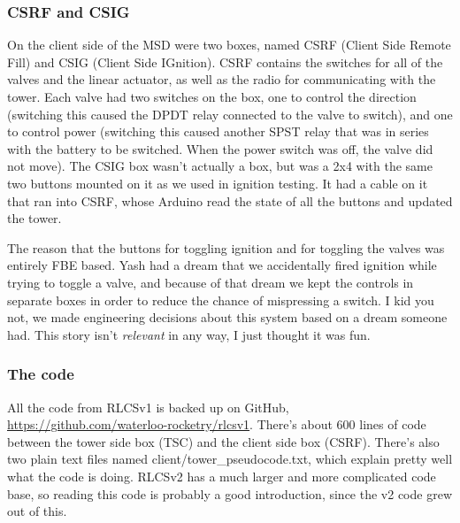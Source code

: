 \documentclass[11pt]{article}
\begin{document}
\subsubsection{CSRF and CSIG}
\label{sec:org3b7548b}

On the client side of the MSD were two boxes, named CSRF (Client Side Remote
Fill) and CSIG (Client Side IGnition). CSRF contains the switches for all of the
valves and the linear actuator, as well as the radio for communicating with the
tower. Each valve had two switches on the box, one to control the direction
(switching this caused the DPDT relay connected to the valve to switch), and one
to control power (switching this caused another SPST relay that was in series
with the battery to be switched. When the power switch was off, the valve did
not move). The CSIG box wasn't actually a box, but was a 2x4 with the same two
buttons mounted on it as we used in ignition testing. It had a cable on it that
ran into CSRF, whose Arduino read the state of all the buttons and updated the
tower.

The reason that the buttons for toggling ignition and for toggling the valves
was entirely FBE based. Yash had a dream that we accidentally fired ignition
while trying to toggle a valve, and because of that dream we kept the controls
in separate boxes in order to reduce the chance of mispressing a switch. I kid
you not, we made engineering decisions about this system based on a dream
someone had. This story isn't \emph{relevant} in any way, I just thought it was fun.

\subsubsection{The code}
\label{sec:orgdacf1c2}

All the code from RLCSv1 is backed up on GitHub,
\url{https://github.com/waterloo-rocketry/rlcsv1}. There's about 600 lines of code
between the tower side box (TSC) and the client side box (CSRF). There's also
two plain text files named client/tower\_pseudocode.txt, which explain pretty well
what the code is doing. RLCSv2 has a much larger and more complicated code base,
so reading this code is probably a good introduction, since the v2 code grew out
of this.
\end{document}
